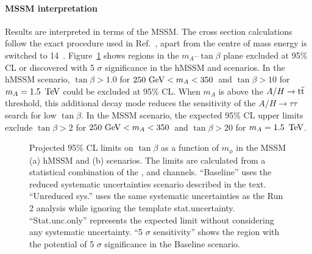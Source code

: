 
\paragraph{MSSM interpretation}
Results are interpreted in terms of the MSSM\@. The cross section calculations follow the exact procedure used in Ref.~\cite{ATLASRun2Ditau}, apart from the centre of mass energy is switched to 14~\TeV. Figure~\ref{fig:model1} shows regions in the $m_A$--$\tan\beta$ plane excluded at 95\% CL or discovered with 5 $\sigma$ significance in the hMSSM and \mhmodp scenarios. In the hMSSM scenario, $\tan\beta > 1.0$ for $250~{\rm{\ensuremath{\text{GeV}}}}< m_A < 350$~\GeV and $\tan\beta > 10$ for $m_A = 1.5~\,\text{Te\hspace{-.08em}V}$ could be excluded at 95\% CL\@. When $m_A$ is above the $A/H\to \text{t}\overline{\text{t}}$ threshold, this additional decay mode reduces the sensitivity of the $A/H\to\tau\tau$ search for low $\tan\beta$. In the MSSM \mhmodp scenario, the expected 95\% CL upper limits exclude $\tan\beta >2$ for $250~{\rm{\ensuremath{\text{GeV}}}}< m_A< 350$~\GeV and $\tan\beta > 20$ for $m_A =1.5~\,\text{Te\hspace{-.08em}V}$.

\begin{figure}[!ht]
    \centering
        \qquad
        \caption{Projected 95\% CL limits on $\tan\beta$ as a function of $m_\phi$ in the MSSM (a) hMSSM and (b) \mhmodp scenarios. The limits are calculated from a statistical combination of the \ehad, \muhad and \hadhad channels. ``Baseline'' uses the reduced systematic uncertainties scenario described in the text. ``Unreduced sys.\@'' uses the same systematic uncertainties as the Run 2 analysis while ignoring the template stat.\@ uncertainty. ``Stat.\@ unc.\@ only'' represents the expected limit without considering any systematic uncertainty. ``5 $\sigma$ sensitivity'' shows the region with the potential of 5 $\sigma$ significance in the Baseline scenario.
        }
    \label{fig:model1}
\end{figure}


